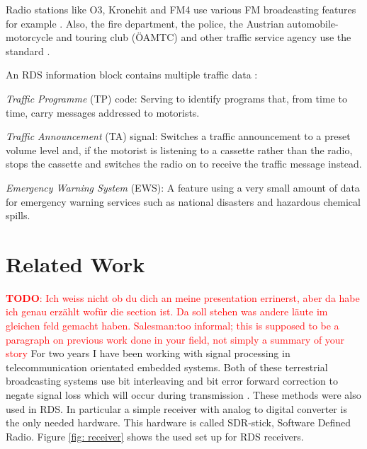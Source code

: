 \documentclass[conference,11pt,a4paper]{IEEEtran}
\newcommand{\todo}[1]{\textcolor{red}{\textbf{TODO}: #1}}
\begin{document}
	Radio stations like O3, Kronehit and FM4 use various FM broadcasting features for example \cite{Stau}. Also, the fire department, the police, the Austrian automobile- motorcycle and touring club (ÖAMTC) and other traffic service agency use the standard \cite{standard}.
	
	An RDS information block contains multiple traffic data \cite{Dietman}: 
	
	\textit{Traffic Programme} (TP) code: Serving to identify programs that, from time to time, carry messages addressed to motorists.
	
	\textit{Traffic Announcement} (TA) signal: Switches a traffic announcement to a preset volume level and, if the motorist is listening to a cassette rather than the radio, stops the cassette and switches the radio on to receive the traffic message instead.
	
	\textit{Emergency Warning System} (EWS): A feature using a very small amount of data for emergency warning services such as national disasters and hazardous chemical spills.
	\\
	
	
	\section{Related Work}
	\todo{Ich weiss nicht ob du dich an meine presentation errinerst, aber da habe ich genau erzählt wofür die section ist. Da soll stehen was andere läute im gleichen feld gemacht haben. Salesman:too informal; this is supposed to be a paragraph on previous work done in your field, not simply a summary of your story}
	For two years I have been working with signal processing in telecommunication orientated embedded systems. Both of these terrestrial broadcasting systems use bit interleaving and bit error forward correction to negate signal loss which will occur during transmission \cite{Terre}. These methods were also used in RDS. In particular a simple receiver with analog to digital converter is the only needed hardware. This hardware is called SDR-stick, Software Defined Radio. Figure \ref{fig: receiver} shows the used set up for RDS receivers.
	
\end{document}
